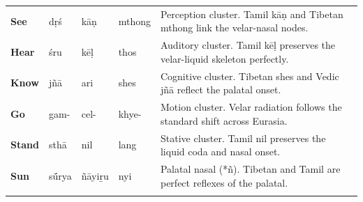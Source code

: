 \begin{longtable}{p{} p{} p{} p{} p{}}
\textbf{See} & dṛś & kāṇ & mthong & \small Perception cluster. Tamil kāṇ and Tibetan mthong link the velar-nasal nodes. \\ 
\addlinespace[10pt]

\textbf{Hear} & śru & kēḷ & thos & \small Auditory cluster. Tamil kēḷ preserves the velar-liquid skeleton perfectly. \\ 
\addlinespace[10pt]

\textbf{Know} & jñā & ari & shes & \small Cognitive cluster. Tibetan shes and Vedic jñā reflect the palatal onset. \\ 
\addlinespace[10pt]

\textbf{Go} & gam- & cel- & khye- & \small Motion cluster. Velar radiation follows the standard shift across Eurasia. \\ 
\addlinespace[10pt]

\textbf{Stand} & sthā & nil & lang & \small Stative cluster. Tamil nil preserves the liquid coda and nasal onset. \\ 
\addlinespace[10pt]

\textbf{Sun} & sū́rya & ñāyiṟu & nyi & \small Palatal nasal (*ñ). Tibetan and Tamil are perfect reflexes of the palatal. \\ 
\addlinespace[10pt]

\end{longtable}

